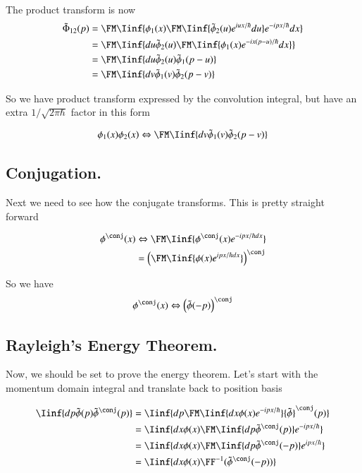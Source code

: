 The product transform is now
\begin{align*}
\tilde{\Phi}_{12}(p) 
&= \FM \Iinf{ \phi_1(x)             \FM \Iinf{\tilde{\phi}_2(u) e^{iux/\hbar} du} e^{-ipx/\hbar} dx} \\
&= \FM \Iinf{ du \tilde{\phi}_2(u)  \FM \Iinf{ \phi_1(x) e^{-ix(p-u)/\hbar} dx } } \\
&= \FM \Iinf{ du \tilde{\phi}_2(u)  \tilde{\phi}_1(p-u) } \\
&= \FM \Iinf{ dv \tilde{\phi}_1(v)  \tilde{\phi}_2(p-v)}  \\
\end{align*}

So we have product transform expressed by the convolution integral, but have an extra $1/\sqrt{2\pi\hbar}$ factor in this form

\begin{align}
\phi_1(x) \phi_2(x) \Leftrightarrow \FM \Iinf{ dv \tilde{\phi}_1(v)  \tilde{\phi}_2(p-v) } \\
\end{align}

\subsection{Conjugation. }

Next we need to see how the conjugate transforms.  This is pretty straight forward

\begin{align*}
\phi^\conj(x) 
&\Leftrightarrow \FM \Iinf{ \phi^\conj(x) e^{-ipx/\hbar dx}} \\
&= \left(\FM \Iinf{ \phi(x) e^{ipx/\hbar dx}}\right)^\conj \\
\end{align*}

So we have
\begin{align*}
\phi^\conj(x) \Leftrightarrow \left(\tilde{\phi}(-p) \right)^\conj \\
\end{align*}

\subsection{Rayleigh's Energy Theorem. }

Now, we should be set to prove the energy theorem.  Let's start with the 
momentum domain integral and translate back to position basis

\begin{align*}
\Iinf{ dp \tilde{\phi}(p){\tilde{\phi}}^\conj(p) } 
&= \Iinf{ dp \FM \Iinf{ dx \phi(x) e^{-ipx/\hbar}} {\tilde{\phi}}^\conj(p) }  \\
&= \Iinf{ dx \phi(x) \FM \Iinf{ dp {\tilde{\phi}}^\conj(p) } e^{-ipx/\hbar}} \\
&= \Iinf{ dx \phi(x) \FM \Iinf{ dp {\tilde{\phi}}^\conj(-p) } e^{ipx/\hbar}} \\
&= \Iinf{ dx \phi(x) \FF^{-1}( {\tilde{\phi}}^\conj(-p) )}  \\
\end{align*}

